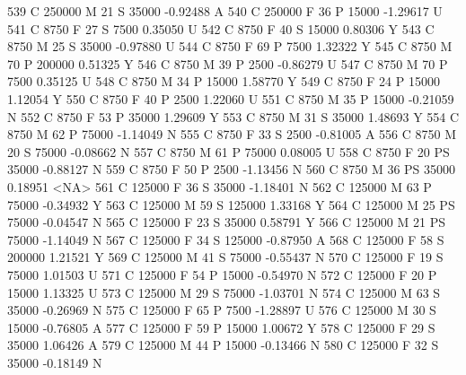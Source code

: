 \documentclass{article}
\begin{document}
\begin{Schunk}
\begin{Soutput}
539       C     250000   M  21         S  35000  -0.92488    A
540       C     250000   F  36         P  15000  -1.29617    U
541       C       8750   F  27         S   7500   0.35050    U
542       C       8750   F  40         S  15000   0.80306    Y
543       C       8750   M  25         S  35000  -0.97880    U
544       C       8750   F  69         P   7500   1.32322    Y
545       C       8750   M  70         P 200000   0.51325    Y
546       C       8750   M  39         P   2500  -0.86279    U
547       C       8750   M  70         P   7500   0.35125    U
548       C       8750   M  34         P  15000   1.58770    Y
549       C       8750   F  24         P  15000   1.12054    Y
550       C       8750   F  40         P   2500   1.22060    U
551       C       8750   M  35         P  15000  -0.21059    N
552       C       8750   F  53         P  35000   1.29609    Y
553       C       8750   M  31         S  35000   1.48693    Y
554       C       8750   M  62         P  75000  -1.14049    N
555       C       8750   F  33         S   2500  -0.81005    A
556       C       8750   M  20         S  75000  -0.08662    N
557       C       8750   M  61         P  75000   0.08005    U
558       C       8750   F  20        PS  35000  -0.88127    N
559       C       8750   F  50         P   2500  -1.13456    N
560       C       8750   M  36        PS  35000   0.18951 <NA>
561       C     125000   F  36         S  35000  -1.18401    N
562       C     125000   M  63         P  75000  -0.34932    Y
563       C     125000   M  59         S 125000   1.33168    Y
564       C     125000   M  25        PS  75000  -0.04547    N
565       C     125000   F  23         S  35000   0.58791    Y
566       C     125000   M  21        PS  75000  -1.14049    N
567       C     125000   F  34         S 125000  -0.87950    A
568       C     125000   F  58         S 200000   1.21521    Y
569       C     125000   M  41         S  75000  -0.55437    N
570       C     125000   F  19         S  75000   1.01503    U
571       C     125000   F  54         P  15000  -0.54970    N
572       C     125000   F  20         P  15000   1.13325    U
573       C     125000   M  29         S  75000  -1.03701    N
574       C     125000   M  63         S  35000  -0.26969    N
575       C     125000   F  65         P   7500  -1.28897    U
576       C     125000   M  30         S  15000  -0.76805    A
577       C     125000   F  59         P  15000   1.00672    Y
578       C     125000   F  29         S  35000   1.06426    A
579       C     125000   M  44         P  15000  -0.13466    N
580       C     125000   F  32         S  35000  -0.18149    N

\end{Soutput}
\end{Schunk}
\end{document}
